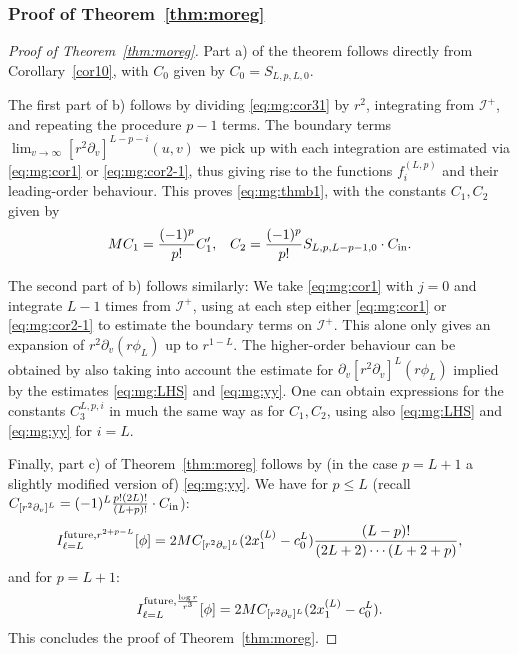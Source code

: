 \documentclass[11pt,english]{article}
\numberwithin{equation}{section}
\theoremstyle{remark}
\theoremstyle{plain}
\theoremstyle{remark}
\newcommand{\pv}{\partial_v}
\renewcommand{\(}{\left(}
\renewcommand{\)}{\right)}
\begin{document}
\subsubsection*{Proof of Theorem~\ref{thm:moreg}}\label{sec:mg:proofofTHM}
\begin{proof}[Proof of Theorem~\ref{thm:moreg}]
Part {a)} of the theorem follows directly from Corollary~\ref{cor10}, with $C_0$ given by $C_0=S_{L,p,L,0}$.

The first part of b) follows by dividing \eqref{eq:mg:cor31} by $r^2$, integrating from $\mathcal I^+$, and repeating the procedure $p-1$ terms. The boundary terms $\lim_{v\to\infty}[r^2\pv]^{L-p-i}(u,v)$ we pick up with each integration are estimated via \eqref{eq:mg:cor1} or \eqref{eq:mg:cor2-1}, thus giving rise to the functions $f_i^{(L,p)}$ and their leading-order behaviour. This proves \eqref{eq:mg:thmb1}, with the constants $C_1, C_2$ given by
\begin{align}\label{auxref}
MC_1=\frac{(-1)^p}{p!}C_1', && C_2=\frac{(-1)^p}{p!} S_{L,p,L-p-1,0}\cdot C_{\mathrm{in}}.
\end{align}


The second part of {b)} follows similarly: We take \eqref{eq:mg:cor1} with $j=0$ and integrate $L-1$ times from $\mathcal I^+$, using at each step either \eqref{eq:mg:cor1} or \eqref{eq:mg:cor2-1} to estimate the boundary terms on $\mathcal I^+$. This alone only gives an expansion of $r^2\pv(r\phi_L)$ up to $r^{1-L}$. The higher-order behaviour can be obtained by  also taking into account the estimate for $\pv[r^2\pv]^L(r\phi_L)$ implied by the estimates \eqref{eq:mg:LHS} and \eqref{eq:mg:yy}. One can obtain expressions for the constants $C_3^{L,p,i}$ in much the same way as for $C_1,C_2$, using also \eqref{eq:mg:LHS} and \eqref{eq:mg:yy} for $i=L$.

Finally, part c) of Theorem~\ref{thm:moreg} follows by (in the case $p=L+1$ a slightly modified version of) \eqref{eq:mg:yy}. We have for $p\leq L$ (recall $\cv{L}=(-1)^L \frac{p!(2L)!}{(L+p)!}\cdot \ci$):
\begin{equation}
I_{\ell=L}^{\mathrm{future}, r^{2+p-L}}[\phi]=2M\cv{L}(2x_1^{(L)}-c_0^L)\frac{(L-p)!}{(2L+2)\cdots (L+2+p)},
\end{equation}
and for $p=L+1$:
\begin{equation}
I_{\ell=L}^{\mathrm{future}, \frac{\log r}{r^3}}[\phi]=2M\cv{L}(2x_1^{(L)}-c_0^L).
\end{equation}
This concludes the proof of Theorem~\ref{thm:moreg}.
\end{proof}
\end{document}
